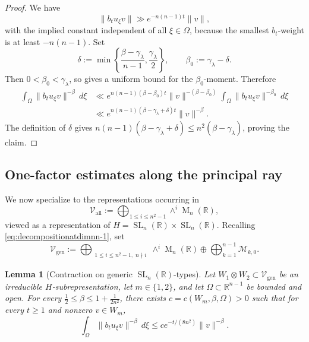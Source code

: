 \documentclass[reqno,11pt]{amsart}
\numberwithin{equation}{section}
\newtheorem{lemma}[theorem]{Lemma}
\theoremstyle{definition}
\theoremstyle{remark}
\newcommand{\op}{\operatorname}
\newcommand{\M}{\op{M}}
\newcommand{\SL}{\op{SL}}
\begin{document}
\begin{proof}
We have 
$$
\|b_tu_\xi v\|\gg e^{-n(n-1)t}\|v\|,
$$
with the implied constant independent of all $\xi\in\Omega$,
because the smallest $b_t$-weight is at least $-n(n-1)$. Set
$$
\delta:=\min\left\{\frac{\beta-\gamma_\lambda}{n-1},\frac{\gamma_\lambda}{2}\right\},
\qquad
\beta_0:=\gamma_\lambda-\delta.
$$
Then $0<\beta_0<\gamma_\lambda$, so
 gives a uniform bound for the
$\beta_0$-moment. Therefore
$$
\begin{aligned}
\int_\Omega\|b_tu_\xi v\|^{-\beta}\,d\xi
&\ll e^{n(n-1)(\beta-\beta_0)t}\|v\|^{-(\beta-\beta_0)}
   \int_\Omega\|b_tu_\xi v\|^{-\beta_0}\,d\xi\\
&\ll e^{n(n-1)(\beta-\gamma_\lambda +\delta)t}\|v\|^{-\beta}.
\end{aligned}
$$
The definition of $\delta$ gives
$n(n-1)(\beta-\gamma_\lambda +\delta)\le n^2 (\beta-\gamma_\lambda)$, proving the claim.
\end{proof}



\subsection{One-factor estimates along the principal ray}

We now specialize to the representations occurring in
\begin{equation}\label{vall}
\mathcal V_{\op{all}}
:=\bigoplus_{1\le i\le n^2-1}\wedge^i\M_n(\mathbb R),
\end{equation}
viewed as a representation of
$H=\SL_n(\mathbb R)\times\SL_n(\mathbb R)$. Recalling
\eqref{eq:decompositionatdimnn-1}, set
$$
\mathcal V_{\op{gen}}
:=
\bigoplus_{\substack{1\le i\le n^2-1, \; n\nmid i}}
\wedge^i\M_n(\mathbb R)
\oplus\bigoplus_{k=1}^{n-1}\mathcal M_{k,0}.
$$

\begin{lemma}[Contraction on generic $\SL_n(\mathbb R)$-types]
\label{lem:generalweightedcontraction}
Let $W_1\otimes W_2\subset\mathcal V_{\op{gen}}$ be an irreducible
$H$-subrepresentation, let $m\in\{1,2\}$, and let
$\Omega\subset\mathbb R^{n-1}$ be bounded and open. For every $\frac12\le\beta\le1+\frac1{2n^2}$,
there exists $c=c(W_m,\beta,\Omega)>0$ such that
for every $t\ge1$ and nonzero $v\in W_m$,
$$
\int_\Omega\|b_tu_\xi v\|^{-\beta}\,d\xi
\le c e^{-t/(8n^2)}\|v\|^{-\beta}.
$$

\end{lemma}
\end{document}
